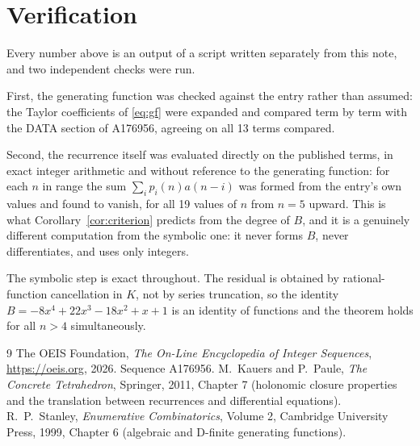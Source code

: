 \documentclass[11pt,a4paper]{article}
\theoremstyle{plain}
\theoremstyle{definition}
\begin{document}
\section{Verification}

Every number above is an output of a script written separately from this note, and two
independent checks were run.

First, the generating function was checked against the entry rather than assumed: the
Taylor coefficients of \eqref{eq:gf} were expanded and compared term by term with the DATA
section of A176956, agreeing on all 13 terms compared.

Second, the recurrence itself was evaluated directly on the published terms, in exact
integer arithmetic and without reference to the generating function: for each $n$ in range
the sum $\sum_{i}p_{i}(n)a(n-i)$ was formed from the entry's own values and found to
vanish, for all 19 values of $n$ from $n=5$ upward. This is what
Corollary~\ref{cor:criterion} predicts from the degree of $B$, and it is a genuinely
different computation from the symbolic one: it never forms $B$, never differentiates, and
uses only integers.

The symbolic step is exact throughout. The residual is obtained by rational-function
cancellation in $K$, not by series truncation, so the identity $B=- 8 x^{4} + 22 x^{3} - 18 x^{2} + x + 1$ is an
identity of functions and the theorem holds for all $n>4$ simultaneously.

\begin{thebibliography}{9}
 The OEIS Foundation, \emph{The On-Line Encyclopedia of Integer Sequences},
\url{https://oeis.org}, 2026. Sequence A176956.
 M.~Kauers and P.~Paule, \emph{The Concrete Tetrahedron}, Springer, 2011,
Chapter 7 (holonomic closure properties and the translation between recurrences and
differential equations).
 R.~P.~Stanley, \emph{Enumerative Combinatorics}, Volume 2, Cambridge
University Press, 1999, Chapter 6 (algebraic and D-finite generating functions).
\end{thebibliography}
\end{document}
